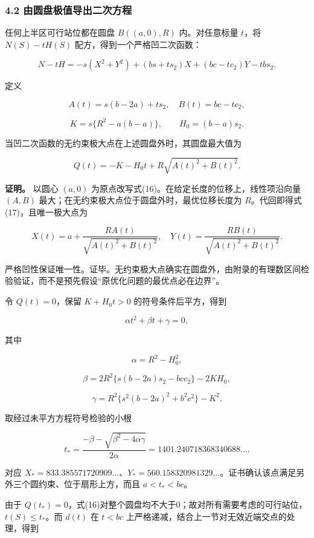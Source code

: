 \documentclass[
  11pt,
  fontset=none]{ctexart}
\begin{document}
\subsubsection{4.2
由圆盘极值导出二次方程}\label{ux7531ux5706ux76d8ux6781ux503cux5bfcux51faux4e8cux6b21ux65b9ux7a0b}

任何上半区可行站位都在圆盘 \(B((a,0),R)\) 内。对任意标量 \(t\)，将
\(N(S)-tH(S)\) 配方，得到一个严格凹二次函数：

\[
N-tH=-s(X^2+Y^2)+(bs+t s_2)X+(bc-t c_2)Y-tb s_2. \tag{16}
\]

定义

\[
A(t)=s(b-2a)+t s_2,\quad B(t)=bc-t c_2,
\]

\[
K=s\{R^2-a(b-a)\},\qquad H_0=(b-a)s_2.
\]

当凹二次函数的无约束极大点在上述圆盘外时，其圆盘最大值为

\[
Q(t)=-K-H_0t+R\sqrt{A(t)^2+B(t)^2}. \tag{17}
\]

\textbf{证明。} 以圆心 \((a,0)\)
为原点改写式(16)。在给定长度的位移上，线性项沿向量 \((A,B)\)
最大；在无约束极大点位于圆盘外时，最优位移长度为
\(R\)。代回即得式(17)，且唯一极大点为

\[
X(t)=a+\frac{RA(t)}{\sqrt{A(t)^2+B(t)^2}},\quad
Y(t)=\frac{RB(t)}{\sqrt{A(t)^2+B(t)^2}}. \tag{18}
\]

严格凹性保证唯一性。证毕。无约束极大点确实在圆盘外，由附录的有理数区间检验验证，而不是预先假设``原优化问题的最优点必在边界''。

令 \(Q(t)=0\)，保留 \(K+H_0t>0\) 的符号条件后平方，得到

\[
\alpha t^2+\beta t+\gamma=0, \tag{19}
\]

其中

\[
\alpha=R^2-H_0^2,
\]

\[
\beta=2R^2\{s(b-2a)s_2-bc c_2\}-2KH_0,
\]

\[
\gamma=R^2\{s^2(b-2a)^2+b^2c^2\}-K^2.
\]

取经过未平方方程符号检验的小根

\[
t_{\text{*}} =\frac{-\beta-\sqrt{\beta^2-4\alpha\gamma}}{2\alpha}
=1401.240718368340688\ldots. \tag{20}
\]

对应
\(X_{\text{*}}=833.385571720909\ldots\)、\(Y_{\text{*}}=560.158320981329\ldots\)。证书确认该点满足另外三个圆约束、位于扇形上方，而且
\(a<t_{\text{*}}<bc\)。

由于
\(Q(t_{\text{*}})=0\)，式(16)对整个圆盘均不大于0；故对所有需要考虑的可行站位，\(t(S)\le t_{\text{*}}\)。而
\(d(t)\) 在 \(t<bc\) 上严格递减，结合上一节对无效近端交点的处理，得到
\end{document}
